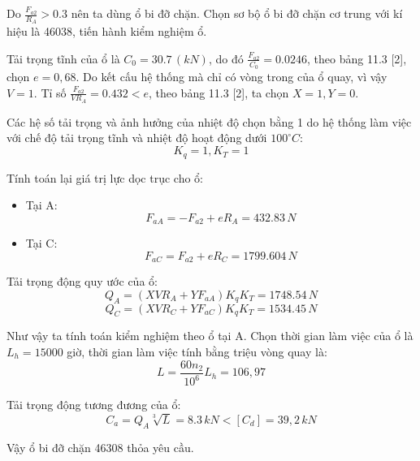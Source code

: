 \noindent Do $\frac{F_{a2}}{R_A} > 0.3$ nên ta dùng ổ bi đỡ chặn. Chọn sơ bộ ổ bi đỡ chặn cơ trung với kí hiệu là 46038, tiến hành kiểm nghiệm ổ.

\noindent Tải trọng tĩnh của ổ là $C_0 = 30.7 \, (kN)$, do đó $\frac{F_{a2}}{C_0} = 0.0246$, theo bảng 11.3 [2], chọn $e = 0,68$. Do kết cấu hệ thống mà chỉ có vòng trong của ổ quay, vì vậy $V = 1$. Tỉ số $\frac{F_{a2}}{VR_A} = 0.432 < e$, theo bảng 11.3 [2], ta chọn $X = 1, Y = 0$.

\noindent Các hệ số tải trọng và ảnh hưởng của nhiệt độ chọn bằng 1 do hệ thống làm việc với chế độ tải trọng tĩnh và nhiệt độ hoạt động dưới $100^\circ C$:
$$ K_q = 1, K_T = 1 $$

\noindent Tính toán lại giá trị lực dọc trục cho ổ:
\begin{itemize}
    \item Tại A:
    \begin{equation}
        F_{aA} = -F_{a2} + eR_A = 432.83 \, N
    \end{equation}
    \item Tại C:
    \begin{equation}
        F_{aC} = F_{a2} + eR_C = 1799.604 \, N
    \end{equation}
\end{itemize}

\noindent Tải trọng động quy ước của ổ:
\begin{equation}
    Q_A = (XVR_A + YF_{aA})K_qK_T = 1748.54 \, N
\end{equation}
\begin{equation}
    Q_C = (XVR_C + YF_{aC})K_qK_T = 1534.45 \, N
\end{equation}

\noindent Như vậy ta tính toán kiểm nghiệm theo ổ tại A. Chọn thời gian làm việc của ổ là $L_h = 15000$ giờ, thời gian làm việc tính bằng triệu vòng quay là:
\begin{equation}
    L = \frac{60n_2}{10^6} L_h = 106,97
\end{equation}

\noindent Tải trọng động tương đương của ổ:
\begin{equation}
    C_a = Q_A \sqrt[3]{L} = 8.3 \, kN < [C_d] = 39,2 \, kN
\end{equation}

\noindent Vậy ổ bi đỡ chặn 46308 thỏa yêu cầu.

